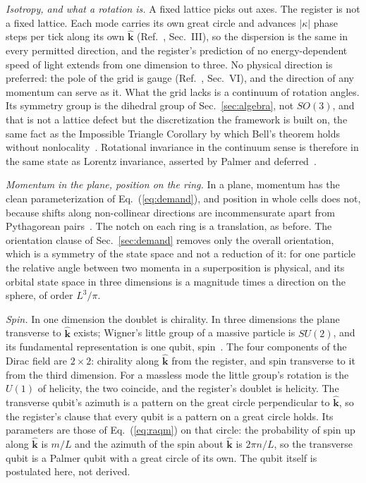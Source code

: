 \documentclass[aps,prd,twocolumn,superscriptaddress,nofootinbib]{revtex4-2}
\begin{document}
\textit{Isotropy, and what a rotation is.} A fixed lattice picks out axes. The register is not a fixed lattice. Each mode carries its own great circle and advances $|\kappa|$ phase steps per tick along its own $\hat{\mathbf{k}}$ (Ref.~\cite{korytko2026c}, Sec.~III), so the dispersion is the same in every permitted direction, and the register's prediction of no energy-dependent speed of light extends from one dimension to three. No physical direction is preferred: the pole of the grid is gauge (Ref.~\cite{korytko2026c}, Sec.~VI), and the direction of any momentum can serve as it. What the grid lacks is a continuum of rotation angles. Its symmetry group is the dihedral group of Sec.~\ref{sec:algebra}, not $SO(3)$, and that is not a lattice defect but the discretization the framework is built on, the same fact as the Impossible Triangle Corollary by which Bell's theorem holds without nonlocality~\cite{palmer2020,palmer2026b}. Rotational invariance in the continuum sense is therefore in the same state as Lorentz invariance, asserted by Palmer and deferred~\cite{palmer2026c}.

\textit{Momentum in the plane, position on the ring.} In a plane, momentum has the clean parameterization of Eq.~(\ref{eq:demand}), and position in whole cells does not, because shifts along non-collinear directions are incommensurate apart from Pythagorean pairs~\cite{korytko2026c}. The notch on each ring is a translation, as before. The orientation clause of Sec.~\ref{sec:demand} removes only the overall orientation, which is a symmetry of the state space and not a reduction of it: for one particle the relative angle between two momenta in a superposition is physical, and its orbital state space in three dimensions is a magnitude times a direction on the sphere, of order $L^3/\pi$.

\textit{Spin.} In one dimension the doublet is chirality. In three dimensions the plane transverse to $\hat{\mathbf{k}}$ exists; Wigner's little group of a massive particle is $SU(2)$, and its fundamental representation is one qubit, spin~\cite{weinberg1995}. The four components of the Dirac field are $2\times2$: chirality along $\hat{\mathbf{k}}$ from the register, and spin transverse to it from the third dimension. For a massless mode the little group's rotation is the $U(1)$ of helicity, the two coincide, and the register's doublet is helicity. The transverse qubit's azimuth is a pattern on the great circle perpendicular to $\hat{\mathbf{k}}$, so the register's clause that every qubit is a pattern on a great circle holds. Its parameters are those of Eq.~(\ref{eq:raqm}) on that circle: the probability of spin up along $\hat{\mathbf{k}}$ is $m/L$ and the azimuth of the spin about $\hat{\mathbf{k}}$ is $2\pi n/L$, so the transverse qubit is a Palmer qubit with a great circle of its own. The qubit itself is postulated here, not derived.
\end{document}
